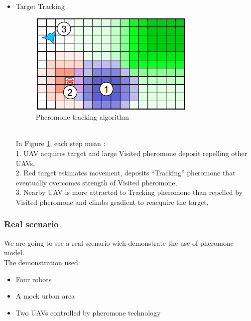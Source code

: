 \begin{itemize}
In Figure \ref{targetacquisition}, each step mean :\\
1. UAVdet detects target and Red target is created,\\
2. Red target deposits “NeedsID” pheromone, \\
3. UAVid is more attracted to NeedsID pheromone than lawn pheromone and climbs gradient to ID target.

\newpage

\item Target Tracking

\begin{figure}[h]
\center
\includegraphics[scale=0.7]{../images/pheromone_tracking.png}
\caption{\label{tracking} Pheromone tracking algorithm}
\end{figure}\\

In Figure \ref{tracking}, each step mean :\\
1. UAV acquires target and large Visited pheromone deposit repelling 
other UAVs,\\
2. Red target estimates movement, deposits “Tracking” pheromone that eventually overcomes strength of Visited pheromone, \\
3. Nearby UAV is more attracted to Tracking pheromone than repelled by Visited pheromone and climbs gradient to reacquire the target. 
\end{itemize}

\newpage

\subsubsection{Real scenario}

We are going to see a real scenario wich demonstrate the use of pheromone model.\\
The demonstration used: 

\begin{itemize}
\item Four robots 
\item A mock urban area  
\item Two UAVs controlled by pheromone technology 
\end{itemize}

